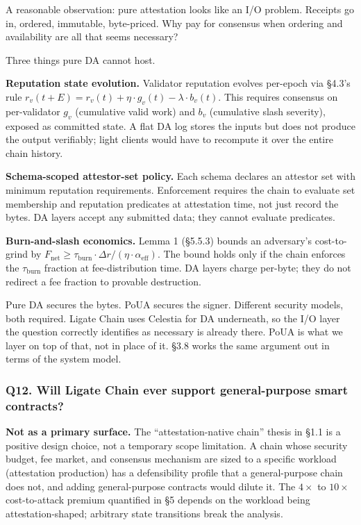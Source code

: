 \documentclass[
  11pt,
]{article}
\begin{document}
A reasonable observation: pure attestation looks like an I/O problem.
Receipts go in, ordered, immutable, byte-priced. Why pay for consensus
when ordering and availability are all that seems necessary?

Three things pure DA cannot host.

\textbf{Reputation state evolution.} Validator reputation evolves
per-epoch via §4.3's rule
\(r_v(t+E) = r_v(t) + \eta \cdot g_v(t) - \lambda \cdot b_v(t)\). This
requires consensus on per-validator \(g_v\) (cumulative valid work) and
\(b_v\) (cumulative slash severity), exposed as committed state. A flat
DA log stores the inputs but does not produce the output verifiably;
light clients would have to recompute it over the entire chain history.

\textbf{Schema-scoped attestor-set policy.} Each schema declares an
attestor set with minimum reputation requirements. Enforcement requires
the chain to evaluate set membership and reputation predicates at
attestation time, not just record the bytes. DA layers accept any
submitted data; they cannot evaluate predicates.

\textbf{Burn-and-slash economics.} Lemma 1 (§5.5.3) bounds an
adversary's cost-to-grind by
\(F_{\text{net}} \geq \tau_{\text{burn}} \cdot \Delta r / (\eta \cdot \alpha_{\text{eff}})\).
The bound holds only if the chain enforces the \(\tau_{\text{burn}}\)
fraction at fee-distribution time. DA layers charge per-byte; they do
not redirect a fee fraction to provable destruction.

Pure DA secures the bytes. PoUA secures the signer. Different security
models, both required. Ligate Chain uses Celestia for DA underneath, so
the I/O layer the question correctly identifies as necessary is already
there. PoUA is what we layer on top of that, not in place of it. §3.8
works the same argument out in terms of the system model.

\subsubsection{Q12. Will Ligate Chain ever support general-purpose smart
contracts?}\label{q12.-will-ligate-chain-ever-support-general-purpose-smart-contracts}

\textbf{Not as a primary surface.} The ``attestation-native chain''
thesis in §1.1 is a positive design choice, not a temporary scope
limitation. A chain whose security budget, fee market, and consensus
mechanism are sized to a specific workload (attestation production) has
a defensibility profile that a general-purpose chain does not, and
adding general-purpose contracts would dilute it. The \(4\times\) to
\(10\times\) cost-to-attack premium quantified in §5 depends on the
workload being attestation-shaped; arbitrary state transitions break the
analysis.
\end{document}
